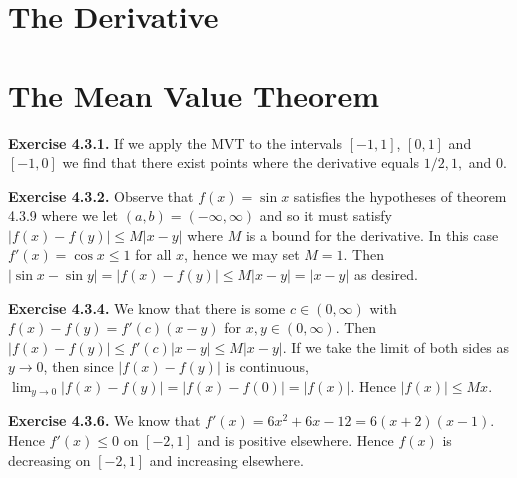 \documentclass[12pt]{book}
\newenvironment{exercise}[2][Exercise]{\begin{trivlist}
\item[\hskip \labelsep {\bfseries #1}\hskip \labelsep {\bfseries #2.}]}{\end{trivlist}}
\newcommand{\prb}[1]{\textbf{Exercise #1.}}
\begin{document}
\section{The Derivative}



\section{The Mean Value Theorem}

\begin{exercise}{4.3.1}
\end{exercise}

\prb{4.3.1} If we apply the MVT to the intervals $[-1, 1]$, $[0, 1]$ and $[-1, 0]$ we find that there exist points where the derivative equals $1/2, 1,$ and $0$.

\prb{4.3.2} Observe that $f(x) = \sin x$ satisfies the hypotheses of theorem 4.3.9 where we let $(a,b) = (-\infty, \infty)$ and so it must satisfy $|f(x) - f(y)| \leq M |x-y|$ where $M$ is a bound for the derivative. In this case $f'(x) = \cos x \leq 1$ for all $x$, hence we may set $M = 1$. Then $|\sin x - \sin y| = |f(x) - f(y)| \leq M |x-y| = |x-y|$ as desired.

\begin{exercise}{4.3.3}
\end{exercise}

\prb{4.3.4} We know that there is some $c \in (0, \infty)$ with $f(x) - f(y) = f'(c) (x-y)$ for $x, y \in (0, \infty)$. Then $|f(x) - f(y)| \leq f'(c) |x-y| \leq M|x-y|$. If we take the limit of both sides as $y \rightarrow 0$, then since $|f(x) - f(y)|$ is continuous, $\displaystyle \lim_{y \rightarrow 0} |f(x) - f(y)| = |f(x) - f(0)| = |f(x)|$. Hence $|f(x)| \leq Mx$.

\begin{exercise}{4.3.5}
\end{exercise}

\prb{4.3.6} We know that $f'(x) = 6x^2 + 6x - 12 = 6(x+2)(x-1)$. Hence $f'(x) \leq 0$ on $[-2, 1]$ and is positive elsewhere. Hence $f(x)$ is decreasing on $[-2, 1]$ and increasing elsewhere.

\begin{exercise}{4.3.7}
\end{exercise}


\begin{exercise}{4.3.8}
\end{exercise}
\end{document}

